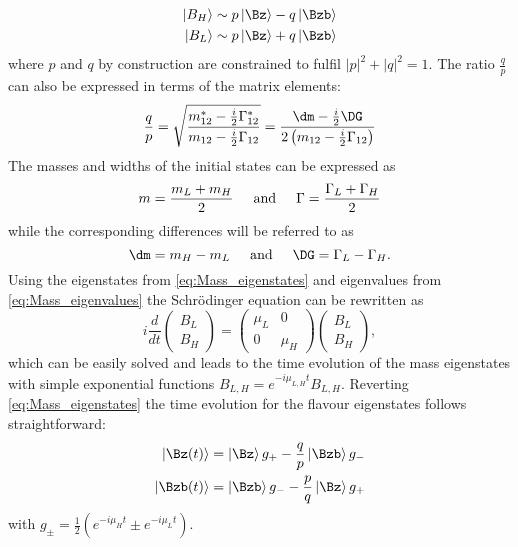 \begin{equation}
\begin{split}
\left|B_H\right>&\sim p\left|\Bz\right>-q\left|\Bzb\right>\\
\left|B_L\right>&\sim p\left|\Bz\right>+q\left|\Bzb\right>\label{eq:Mass_eigenstates}
\end{split}
\end{equation}
where $p$ and $q$ by construction are constrained to fulfil $\left|p\right|^2+\left|q\right|^2=1$.
The ratio $\frac{q}{p}$ can also be expressed in terms of the matrix elements:
\begin{equation}
\frac{q}{p}=\sqrt{ \frac{ m_{12}^\ast-\frac{i}{2}\Gamma_{12}^\ast }{ m_{12}-\frac{i}{2}\Gamma_{12} }}
=\frac{\dm-\frac{i}{2}\DG}{2\left(m_{12}-\frac{i}{2}\Gamma_{12}\right)}
\end{equation}
The masses and widths of the initial states can be expressed as
\begin{equation}
m=\frac{m_L+m_H}{2}\hspace{0.5cm}\text{and}\hspace{0.5cm}\Gamma=\frac{\Gamma_L+\Gamma_H}{2}
\end{equation}
while the corresponding differences will be referred to as
\begin{equation}
\dm=m_H-m_L\hspace{0.5cm}\text{and}\hspace{0.5cm}\DG=\Gamma_L-\Gamma_H.
\end{equation}
Using the eigenstates from \cref{eq:Mass_eigenstates} and eigenvalues from \cref{eq:Mass_eigenvalues} the Schrödinger equation can be rewritten as
\begin{equation}
i\frac{d}{dt}\begin{pmatrix} B_L \\ B_H \end{pmatrix} = \begin{pmatrix} \mu_L & 0 \\ 0 & \mu_H \end{pmatrix}\begin{pmatrix} B_L \\ B_H \end{pmatrix},
\end{equation}
which can be easily solved and leads to the time evolution of the mass eigenstates with simple exponential functions $B_{L,H}=e^{-i\mu_{L,H}t}B_{L,H}$.
Reverting \cref{eq:Mass_eigenstates} the time evolution for the flavour eigenstates follows straightforward:
\begin{equation}
\begin{split}
\left|\Bz\!\left(t\right)\right>&=\left|\Bz\right>g_+-\frac{q}{p}\left|\Bzb\right>g_-\\
\left|\Bzb\!\left(t\right)\right>&=\left|\Bzb\right>g_--\frac{p}{q}\left|\Bz\right>g_+
\end{split}
\end{equation}
with $g_\pm=\frac{1}{2}\left(e^{-i\mu_Ht}\pm e^{-i\mu_Lt}\right)$.


